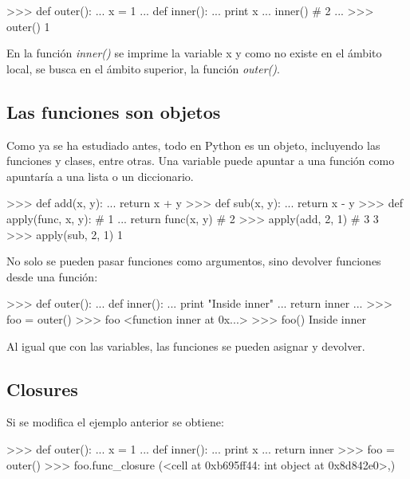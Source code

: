 \begin{pyglist} [language=python]
>>> def outer():
...     x = 1
...     def inner():
...         print x
...     inner() # 2
...
>>> outer()
1
\end{pyglist}

En la función \textit{inner()} se imprime la variable x y como no existe en el ámbito local, se busca en el ámbito superior, la función \textit{outer()}.

\subsection{Las funciones son objetos}

Como ya se ha estudiado antes, todo en Python es un objeto, incluyendo las funciones y clases, entre otras. Una variable puede apuntar a una función como apuntaría a una lista o un diccionario.\\

\begin{pyglist} [language=python]
>>> def add(x, y):
...     return x + y
>>> def sub(x, y):
...     return x - y
>>> def apply(func, x, y): # 1
...     return func(x, y) # 2
>>> apply(add, 2, 1) # 3
3
>>> apply(sub, 2, 1)
1
\end{pyglist}

No solo se pueden pasar funciones como argumentos, sino devolver funciones desde una función:\\

\begin{pyglist} [language=python]
>>> def outer():
...     def inner():
...         print "Inside inner"
...     return inner
...
>>> foo = outer()
>>> foo
<function inner at 0x...>
>>> foo()
Inside inner
\end{pyglist}

Al igual que con las variables, las funciones se pueden asignar y devolver.

\subsection{Closures}

Si se modifica el ejemplo anterior se obtiene:\\

\begin{pyglist} [language=python]
>>> def outer():
...     x = 1
...     def inner():
...         print x
...     return inner
>>> foo = outer()
>>> foo.func_closure 
(<cell at 0xb695ff44: int object at 0x8d842e0>,)
\end{pyglist}

